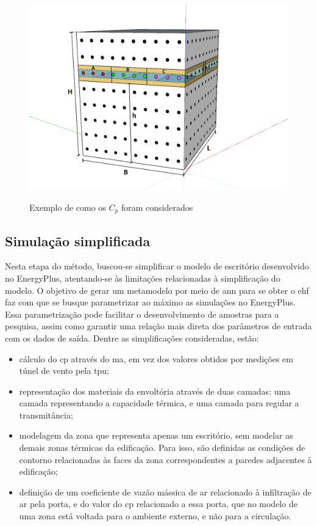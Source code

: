 \documentclass[brazil,hardcopy,openany]{ufscthesis} %
\begin{document}
\begin{figure}[h]
	\centering
	\caption{Exemplo de como os $C_p$ foram considerados}
	\includegraphics[width=.8\linewidth]{img/ex_TPU_h.png}
	\label{fig:tpuwindows}
\end{figure}


\subsection{Simulação simplificada}

Nesta etapa do método, buscou-se simplificar o modelo de escritório desenvolvido no EnergyPlus, atentando-se às limitações relacionadas à simplificação do modelo.
O objetivo de gerar um metamodelo por meio de \acrfull{ann} para se obter o \acrshort{ehf} faz com que se busque parametrizar ao máximo as simulações no EnergyPlus.
Essa parametrização pode facilitar o desenvolvimento de amostras para a pesquisa, assim como garantir uma relação mais direta dos parâmetros de entrada com os dados de saída. 
Dentre as simplificações consideradas, estão:

\begin{itemize}
	\item cálculo do \acrshort{cp} através do \acrlong{ma}, em vez dos valores obtidos por medições em túnel de vento pela \acrshort{tpu};
	\item representação dos materiais da envoltória através de duas camadas: uma camada representando a capacidade térmica, e uma camada para regular a transmitância;  %
	\item modelagem da zona que representa apenas um escritório, sem modelar as demais zonas térmicas da edificação. Para isso, são definidas as condições de contorno relacionadas às faces da zona correspondentes a paredes adjacentes à edificação;
	\item definição de um coeficiente de vazão mássica de ar relacionado à infiltração de ar pela porta, e do valor do \acrshort{cp} relacionado a essa porta, que no modelo de uma zona está voltada para o ambiente externo, e não para a circulação.
\end{itemize}
\end{document}
